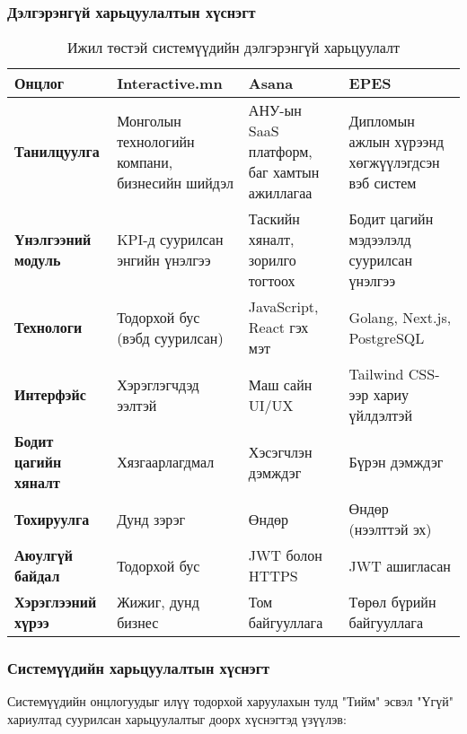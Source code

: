 \subsubsection{Дэлгэрэнгүй харьцуулалтын хүснэгт}
\begin{table}[H]
\centering
\small
\begin{tabular}{|p{2.5cm}|p{3.5cm}|p{3.5cm}|p{3.5cm}|}
\hline
\textbf{Онцлог} & \textbf{Interactive.mn} & \textbf{Asana} & \textbf{EPES} \\
\hline
\textbf{Танилцуулга} & Монголын технологийн компани, бизнесийн шийдэл & АНУ-ын SaaS платформ, баг хамтын ажиллагаа & Дипломын ажлын хүрээнд хөгжүүлэгдсэн вэб систем \\
\hline
\textbf{Үнэлгээний модуль} & KPI-д суурилсан энгийн үнэлгээ & Таскийн хяналт, зорилго тогтоох & Бодит цагийн мэдээлэлд суурилсан үнэлгээ \\
\hline
\textbf{Технологи} & Тодорхой бус (вэбд суурилсан) & JavaScript, React гэх мэт & Golang, Next.js, PostgreSQL \\
\hline
\textbf{Интерфэйс} & Хэрэглэгчдэд ээлтэй & Маш сайн UI/UX & Tailwind CSS-ээр хариу үйлдэлтэй \\
\hline
\textbf{Бодит цагийн хяналт} & Хязгаарлагдмал & Хэсэгчлэн дэмждэг & Бүрэн дэмждэг \\
\hline
\textbf{Тохируулга} & Дунд зэрэг & Өндөр & Өндөр (нээлттэй эх) \\
\hline
\textbf{Аюулгүй байдал} & Тодорхой бус & JWT болон HTTPS & JWT ашигласан \\
\hline
\textbf{Хэрэглээний хүрээ} & Жижиг, дунд бизнес & Том байгууллага & Төрөл бүрийн байгууллага \\
\hline
\end{tabular}
\caption{Ижил төстэй системүүдийн дэлгэрэнгүй харьцуулалт}
\label{tab:detailed_comparison}
\end{table}

\subsubsection{Системүүдийн харьцуулалтын хүснэгт}
Системүүдийн онцлогуудыг илүү тодорхой харуулахын тулд "Тийм" эсвэл "Үгүй" хариултад суурилсан харьцуулалтыг доорх хүснэгтэд үзүүлэв:

